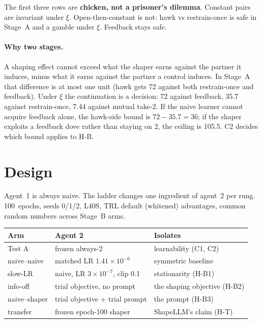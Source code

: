 \documentclass[11pt,a4paper]{article}
\begin{document}
\vspace{-0.3em}
The first three rows are \textbf{chicken, not a prisoner's dilemma}.
Constant pairs are invariant under \(\xi\).
Open-then-constant is not: hawk vs restrain-once is safe in Stage~A and a gamble under \(\xi\).
Feedback stays safe.

\paragraph{Why two stages.}
A shaping effect cannot exceed what the shaper earns against the partner it induces, minus what it earns against the partner a control induces.
In Stage~A that difference is at most one unit (hawk gets 72 against both restrain-once and feedback).
Under \(\xi\) the continuation is a decision: 72 against feedback, 35.7 against restrain-once, 7.44 against mutual take-2.
If the naive learner cannot acquire feedback alone, the hawk-side bound is \(72-35.7=36\); if the shaper exploits a feedback dove rather than staying on 2, the ceiling is 105.5.
C2 decides which bound applies to H-B.

\section*{Design}
Agent~1 is always naive.
The ladder changes one ingredient of agent~2 per rung.
100~epochs, seeds 0/1/2, L40S, TRL default (whitened) advantages, common random numbers across Stage~B arms.

\begin{center}
\small\vspace{-0.3em}
\begin{tabular}{@{}lll@{}}
\toprule
Arm & Agent 2 & Isolates \\
\midrule
Test A & frozen always-2 & learnability (C1, C2) \\
naive--naive & matched LR \(1.41\times10^{-6}\) & symmetric baseline \\
slow-LR & naive, LR \(3\times10^{-7}\), clip 0.1 & stationarity (H-B1) \\
info-off & trial objective, no prompt & the shaping objective (H-B2) \\
naive--shaper & trial objective + trial prompt & the prompt (H-B3) \\
transfer & frozen epoch-100 shaper & ShapeLLM's claim (H-T) \\
\bottomrule
\end{tabular}
\end{center}
\end{document}
